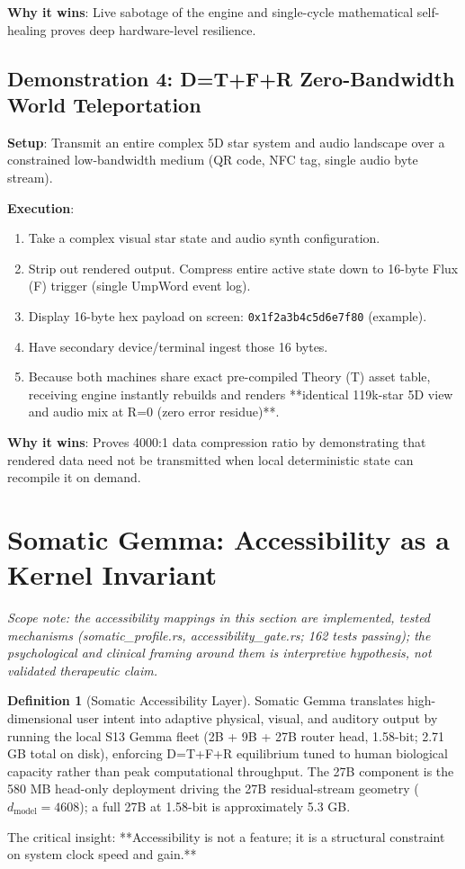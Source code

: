 \documentclass[11pt,oneside]{article}
\theoremstyle{definition}
\newtheorem{definition}[theorem]{Definition}
\begin{document}
\textbf{Why it wins}: Live sabotage of the engine and single-cycle mathematical self-healing proves deep hardware-level resilience.

\subsection{Demonstration 4: D=T+F+R Zero-Bandwidth World Teleportation}

\textbf{Setup}: Transmit an entire complex 5D star system and audio landscape over a constrained low-bandwidth medium (QR code, NFC tag, single audio byte stream).

\textbf{Execution}:
\begin{enumerate}
  \item Take a complex visual star state and audio synth configuration.
  \item Strip out rendered output. Compress entire active state down to 16-byte Flux (F) trigger (single UmpWord event log).
  \item Display 16-byte hex payload on screen: \texttt{0x1f2a3b4c5d6e7f80} (example).
  \item Have secondary device/terminal ingest those 16 bytes.
  \item Because both machines share exact pre-compiled Theory (T) asset table, receiving engine instantly rebuilds and renders **identical 119k-star 5D view and audio mix at R=0 (zero error residue)**.
\end{enumerate}

\textbf{Why it wins}: Proves 4000:1 data compression ratio by demonstrating that rendered data need not be transmitted when local deterministic state can recompile it on demand.

\section{Somatic Gemma: Accessibility as a Kernel Invariant}

\textit{Scope note: the accessibility mappings in this section are implemented, tested mechanisms (somatic\_profile.rs, accessibility\_gate.rs; 162 tests passing); the psychological and clinical framing around them is interpretive hypothesis, not validated therapeutic claim.}

\begin{definition}[Somatic Accessibility Layer]
Somatic Gemma translates high-dimensional user intent into adaptive physical, visual, and auditory output by running the local S13 Gemma fleet (2B + 9B + 27B router head, 1.58-bit; 2.71 GB total on disk), enforcing D=T+F+R equilibrium tuned to human biological capacity rather than peak computational throughput. The 27B component is the 580 MB head-only deployment driving the 27B residual-stream geometry ($d_{\text{model}} = 4608$); a full 27B at 1.58-bit is approximately 5.3 GB.

The critical insight: **Accessibility is not a feature; it is a structural constraint on system clock speed and gain.**
\end{definition}
\end{document}
